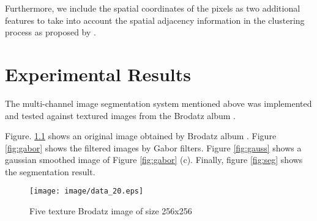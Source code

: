 \documentclass[article,oneside]{memoir}
\begin{document}
Furthermore, we include the spatial coordinates of the pixels as two additional features to take into account the spatial adjacency information in the clustering process as proposed by \cite{Jain}. 

\chapter{Experimental Results}

The multi-channel image segmentation system mentioned above was implemented and tested against textured images from the Brodatz album \cite{dataset}. 

Figure. \ref{fig:original} shows an original image obtained by Brodatz album \cite{dataset}. 
Figure \ref{fig:gabor} shows the filtered images by Gabor filters. 
Figure \ref{fig:gauss} shows a gaussian smoothed image of Figure \ref{fig:gabor} (c). 
Finally, figure \ref{fig:seg} shows the segmentation result. 

\begin{figure}[ht]
\begin{center}
\texttt{[image: image/data\_20.eps]}
\end{center}
 \caption{Five texture Brodatz image of size 256x256}
\label{fig:original}
\end{figure}


\end{document}
